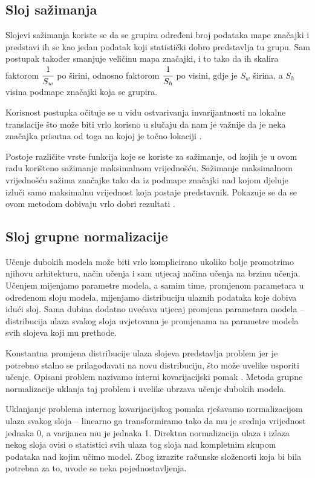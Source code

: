 \documentclass[times, utf8, diplomski, numeric]{fer}
\begin{document}
\subsection{Sloj sažimanja}
Slojevi sažimanja koriste se da se grupira određeni broj podataka mape značajki i predstavi ih se kao jedan podatak koji statistički dobro predstavlja tu grupu.
Sam postupak također smanjuje veličinu mapa značajki, i to tako da ih skalira faktorom $\cfrac{1}{S_w}$ po širini, odnosno faktorom $\cfrac{1}{S_h}$ po visini, gdje je $S_w$ širina, a $S_h$ visina podmape značajki koja se grupira.

Korisnost postupka očituje se u vidu ostvarivanja invarijantnosti na lokalne translacije što može biti vrlo korisno u slučaju da nam je važnije da je neka značajka prisutna od toga na kojoj je točno lokaciji \citep{seminar:rela}.

Postoje različite vrste funkcija koje se koriste za sažimanje, od kojih je u ovom radu korišteno sažimanje maksimalnom vrijednošću.
Sažimanje maksimalnom vrijednošću  sažima značajke tako da iz podmape značajki nad kojom djeluje izluči samo maksimalnu vrijednost koja postaje predstavnik.
Pokazuje se da se ovom metodom dobivaju vrlo dobri rezultati \citep{article:maxpooling_article}.

\subsection{Sloj grupne normalizacije }
Učenje dubokih modela može biti vrlo komplicirano ukoliko bolje promotrimo njihovu arhitekturu, način učenja i sam utjecaj načina učenja na brzinu učenja.
Učenjem mijenjamo parametre modela, a samim time, promjenom parametara u određenom sloju modela, mijenjamo distribuciju ulaznih podataka koje dobiva idući sloj.
Sama dubina dodatno uvećava utjecaj promjena parametara modela -- distribucija ulaza svakog sloja uvjetovana je promjenama na parametre modela svih slojeva koji mu prethode.

Konstantna promjena distribucije ulaza slojeva predstavlja problem jer je potrebno stalno se prilagođavati na novu distribuciju, što može uvelike usporiti učenje.
Opisani problem nazivamo interni kovarijacijski pomak . 
Metoda grupne normalizacije  uklanja taj problem i uvelike ubrzava učenje dubokih modela.

Uklanjanje problema internog kovarijacijskog pomaka rješavamo normalizacijom ulaza svakog sloja -- linearno ga transformiramo tako da mu je srednja vrijednost jednaka 0, a varijanca mu je jednaka 1.
Direktna normalizacija ulaza i izlaza nekog sloja ovisi o statistici svih ulaza tog sloja nad kompletnim skupom podataka nad kojim učimo model.
Zbog izrazite računske složenosti koja bi bila potrebna za to, uvode se neka pojednostavljenja.
\end{document}
